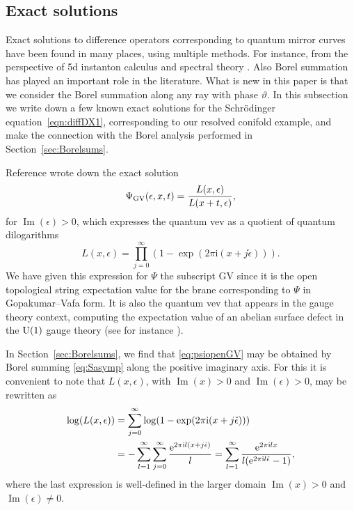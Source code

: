 \documentclass[pdftex]{sigma}
\numberwithin{equation}{section}
\begin{document}
\subsection{Exact solutions}\label{sec:psinp}

Exact solutions to difference operators corresponding to quantum mirror curves have been found in many places, using multiple methods. For instance, from the perspective of 5d instanton calculus \cite{Bullimore:2014awa, Gaiotto:2014ina} and spectral theory \cite{Marino:2016rsq}. Also Borel summation has played an important role in the literature. What is new in this paper is that we consider the Borel summation along any ray with phase $\vartheta$. In this subsection we write down a few known exact solutions for the Schr\"odinger equation~\eqref{eqn:diffDX1}, corresponding to our resolved conifold example, and make the connection with the Borel analysis performed in Section~\ref{sec:Borelsums}.

Reference \cite{ACDKV} wrote down the exact solution
\begin{equation} \label{eq:psiopenGV}
 \Psi_{{\rm GV}}(\epsilon,x,t)= \frac{L(x,\epsilon)}{L(x+t,\epsilon)},
\end{equation}
for $\operatorname{Im}(\epsilon)>0$, which expresses the quantum vev as a quotient of quantum dilogarithms
\begin{equation}\label{eqn:quandilog}
 L(x,\epsilon)=\prod_{j=0}^{\infty} (1-\exp(2\pi \mathrm{i} (x + j \check\epsilon))).
\end{equation}
 We have given this expression for $\Psi$ the subscript GV since it is the open topological string expectation value for the brane corresponding to $\Psi$ in Gopakumar--Vafa form. It is also the quantum vev that appears in the gauge theory context, computing the expectation value of an abelian surface defect in the ${\rm U}(1)$ gauge theory (see for instance \cite{Dimofte:2010tz}).

In Section~\ref{sec:Borelsums}, we find that \eqref{eq:psiopenGV} may be obtained by Borel summing \eqref{eq:Sasymp} along the positive imaginary axis.
For this it is convenient to note that $L(x,\epsilon)$, with $\operatorname{Im}(x)>0$ and $\operatorname{Im}(\epsilon)>0$, may be rewritten as
\begin{align}
 \log(L(x,\epsilon))&=\sum_{j=0}^{\infty}\log(1-\exp(2\pi \mathrm{i}(x+j\check\epsilon)))\nonumber\\
 &=-\sum_{l=1}^{\infty}\sum_{j=0}^{\infty}\frac{{\rm e}^{2\pi \mathrm{i} l(x+j\check\epsilon)}}{l} =\sum_{l=1}^{\infty}\frac{{\rm e}^{2\pi \mathrm{i} lx}}{l({\rm e}^{2\pi \mathrm{i} l\check\epsilon}-1)},\label{LGV}
 \end{align}
where the last expression is well-defined in the larger domain $\operatorname{Im}(x)>0$ and $\operatorname{Im}(\epsilon)\neq 0$.
\end{document}
